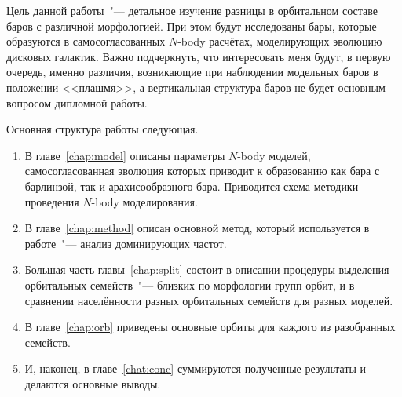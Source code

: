\documentclass{trlnotes}
\begin{document}
Цель данной работы~"--- детальное изучение разницы в орбитальном составе баров с  различной морфологией. При этом будут исследованы бары, которые образуются в самосогласованных $N$-body расчётах, моделирующих эволюцию дисковых галактик. Важно подчеркнуть, что интересовать меня будут, в первую очередь, именно различия, возникающие при наблюдении модельных баров в положении <<плашмя>>, а вертикальная структура баров не будет основным вопросом дипломной работы. 

Основная структура работы следующая.

\begin{enumerate}
\item В главе~\ref{chap:model} описаны параметры $N$-body моделей, самосогласованная эволюция которых приводит к образованию как бара с барлинзой, так и
арахисообразного бара. Приводится схема методики проведения $N$-body моделирования.
\item В главе~\ref{chap:method} описан основной метод, который используется в работе~"--- анализ 
доминирующих частот.
\item Большая часть главы~\ref{chap:split} состоит в описании процедуры выделения орбитальных семейств~"---
близких по морфологии групп орбит, и в сравнении населённости разных орбитальных семейств для разных моделей. 
\item В главе~\ref{chap:orb} приведены основные орбиты для каждого из разобранных семейств.
\item И, наконец, в главе~\ref{chat:conc} суммируются полученные результаты и делаются основные выводы.
\end{enumerate}
\end{document}
